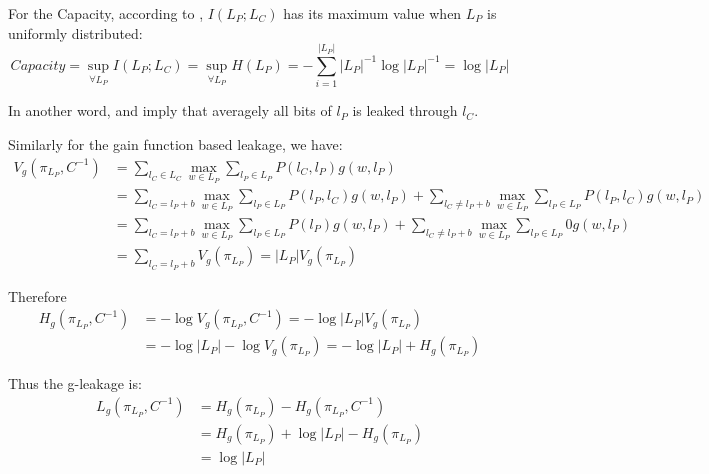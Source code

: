 For the Capacity, according to , $I(L_{P};L_{C})$ has its maximum value when $L_{P}$ is uniformly distributed:
\begin{equation} \label{Eq: Cap in length}
	Capacity = \sup_{\forall L_{P}}{I(L_{P};L_{C})} = \sup_{\forall L_{P}}H(L_{P}) = - \sum_{i = 1}^{|L_{P}|}|L_{P}|^{-1}\log{|L_{P}|^{-1}} = \log{|L_{P}|}
\end{equation}

In another word,  and   imply that averagely all bits of $l_{P}$ is leaked through $l_{C}$.

Similarly for the gain function based leakage\cite{GLeakage}, we have:
\begin{equation}
	\begin{aligned}
		V_{g}(\pi_{L_P}, C^{-1}) 
		&= \sum_{l_{C} \in L_{C}}\max_{w \in L_{P}}\sum_{l_{P} \in L_{P}}P(l_{C},l_{P})g(w,l_{P}) \\
		&= \sum_{l_{C} = l_{P}+b}\max_{w \in L_{P}}\sum_{l_{P} \in L_{P}}P(l_{P},l_{C})g(w,l_{P}) + \sum_{l_{C} \neq l_{P}+b}\max_{w \in L_{P}}\sum_{l_{P} \in L_{P}}P(l_{P},l_{C})g(w,l_{P}) \\
		&= \sum_{l_{C} = l_{P}+b}\max_{w \in L_{P}}\sum_{l_{P} \in L_{P}}P(l_{P})g(w,l_{P}) + \sum_{l_{C} \neq l_{P}+b}\max_{w \in L_{P}}\sum_{l_{P} \in L_{P}}0g(w,l_{P}) \\
		&= \sum_{l_{C} = l_{P}+b}V_g(\pi_{L_P}) = |L_{P}| V_g(\pi_{L_P})
	\end{aligned}
\end{equation}

Therefore
\begin{equation}
	\begin{aligned}
		H_{g}(\pi_{L_{P}}, C^{-1})
		 &= - \log{V_g(\pi_{L_{P}}, C^{-1})} = - \log|L_{P}|V_{g}(\pi_{L_{P}}) \\
		 &= - \log|L_{P}| - \log{V_{g}(\pi_{L_P})} = - \log{|L_{P}|} + H_g(\pi_{L_P})
	\end{aligned}
\end{equation}

Thus the g-leakage is:
\begin{equation}
	\begin{aligned}
	L_g(\pi_{L_P}, C^{-1}) 
	 &= H_g(\pi_{L_P}) - H_{g}(\pi_{L_{P}}, C^{-1}) \\
	 &= H_g(\pi_{L_P}) + \log{|L_{P}|} - H_g(\pi_{L_P}) \\
	 &= \log{|L_{P}|} 
	\end{aligned}
\end{equation}

